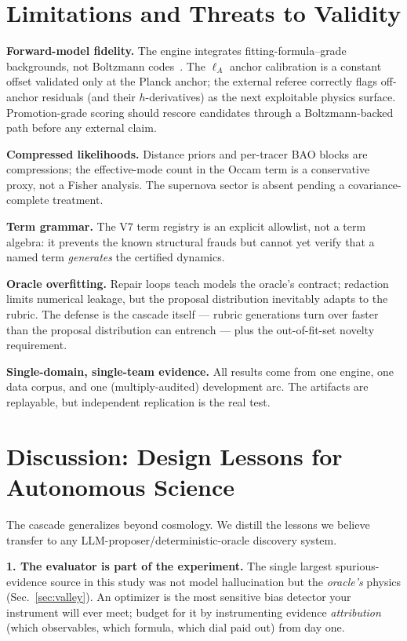 \documentclass[journal]{IEEEtran}
\newcommand{\lA}{\ell_A}
\begin{document}
\section{Limitations and Threats to Validity}
\label{sec:limits}
\textbf{Forward-model fidelity.} The engine integrates fitting-formula--grade
backgrounds, not Boltzmann codes~\cite{class2011,hiclass2017}. The $\lA$ anchor
calibration is a constant offset validated only at the Planck anchor; the external
referee correctly flags off-anchor residuals (and their $h$-derivatives) as the next
exploitable physics surface. Promotion-grade scoring should rescore candidates through a
Boltzmann-backed path before any external claim.

\textbf{Compressed likelihoods.} Distance priors and per-tracer BAO blocks are
compressions; the effective-mode count in the Occam term is a conservative proxy, not a
Fisher analysis. The supernova sector is absent pending a covariance-complete
treatment.

\textbf{Term grammar.} The V7 term registry is an explicit allowlist, not a term
algebra: it prevents the known structural frauds but cannot yet verify that a named term
\emph{generates} the certified dynamics.

\textbf{Oracle overfitting.} Repair loops teach models the oracle's contract; redaction
limits numerical leakage, but the proposal distribution inevitably adapts to the rubric.
The defense is the cascade itself --- rubric generations turn over faster than the
proposal distribution can entrench --- plus the out-of-fit-set novelty requirement.

\textbf{Single-domain, single-team evidence.} All results come from one engine, one
data corpus, and one (multiply-audited) development arc. The artifacts are replayable,
but independent replication is the real test.

\section{Discussion: Design Lessons for Autonomous Science}
\label{sec:discussion}
The cascade generalizes beyond cosmology. We distill the lessons we believe transfer to
any LLM-proposer/deterministic-oracle discovery system.

\textbf{1. The evaluator is part of the experiment.} The single largest spurious-evidence
source in this study was not model hallucination but the \emph{oracle's} physics
(Sec.~\ref{sec:valley}). An optimizer is the most sensitive bias detector your
instrument will ever meet; budget for it by instrumenting evidence \emph{attribution}
(which observables, which formula, which dial paid out) from day one.
\end{document}
